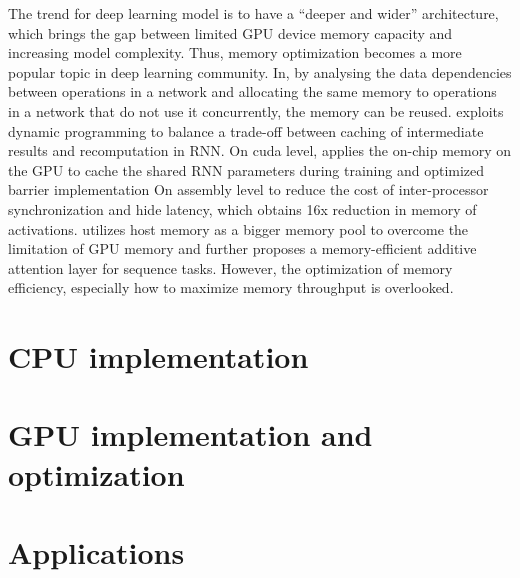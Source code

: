 \documentclass{article}
\begin{document}
 The trend for deep learning model is to have a “deeper and wider” architecture, which brings the gap between limited GPU device memory capacity and increasing model complexity. Thus, memory optimization becomes a more popular topic in deep learning community. In\cite{chen2015mxnet}, by analysing the data dependencies between operations in a network and allocating the same memory to operations in a network that do not use it concurrently, the memory can be reused.  \cite{gruslys2016memory} exploits dynamic programming to balance a trade-off between caching of intermediate results and recomputation in RNN. On cuda level, \cite{diamos2016persistent} applies the on-chip memory on the GPU to cache the shared RNN parameters during training and optimized barrier implementation On assembly level to reduce the cost of inter-processor synchronization and hide latency, which obtains 16x reduction in memory of activations. \cite{mengtraining} utilizes host memory as a bigger memory pool to overcome the limitation of GPU memory and further proposes a memory-efficient additive attention layer\cite{bahdanau2014neural} for sequence tasks. However, the optimization of memory efficiency, especially how to maximize memory throughput is overlooked. 



\section{CPU implementation}

\section{GPU implementation and optimization}

\section{Applications}


\medskip



\end{document}

